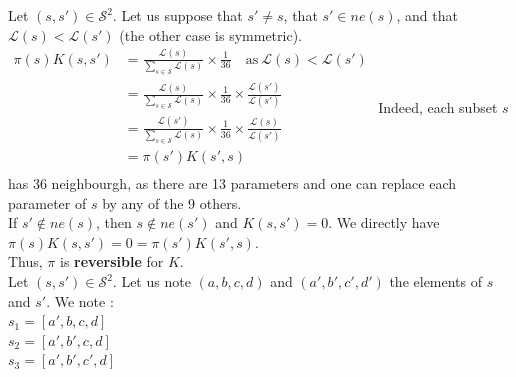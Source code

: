 Let $(s, s') \in \mathcal{S}^2$. Let us suppose that $ s' \neq s$, that  $s' \in ne(s)$, and that $\mathcal{L}(s) < \mathcal{L}(s')$ (the other case is symmetric). \\[0.15cm]
$
\begin{aligned}
    \pi(s)K(s, s') &=  \frac{\mathcal{L}(s)}{\sum_{s \in \mathcal{S}} \mathcal{L}(s)} \times \frac{1}{36} \quad \text{as} \ \mathcal{L}(s) < \mathcal{L}(s') \\
    &=  \frac{\mathcal{L}(s)}{\sum_{s \in \mathcal{S}} \mathcal{L}(s)} \times \frac{1}{36} \times \frac{\mathcal{L}(s')}{\mathcal{L}(s')} \\
    &=  \frac{\mathcal{L}(s')}{\sum_{s \in \mathcal{S}} \mathcal{L}(s)} \times \frac{1}{36} \times \frac{\mathcal{L}(s)}{\mathcal{L}(s')} \\
    &= \pi(s')K(s', s)\\[0.3cm]
\end{aligned}
$
\newline
Indeed, each subset $s$ has 36 neighbourgh, as there are 13 parameters and one can replace each parameter of $s$ by any of the 9 others. \\

If $s' \notin ne(s)$, then $s \notin ne(s')$ and $K(s, s') = 0$.
We directly have $\pi(s)K(s, s') = 0 = \pi(s')K(s', s)$.\\

Thus, $\pi$ is \textbf{reversible} for $K$.\\[0.3cm]
Let $(s, s') \in \mathcal{S}^2$. Let us note $(a, b, c, d)$ and $(a', b', c', d')$ the elements of $s$ and $s'$.
We note : \\
$s_1 = [a', b, c, d]$\\
$ s_2 = [a', b', c, d]$ \\
$s_3 = [a', b', c', d]$ \\


